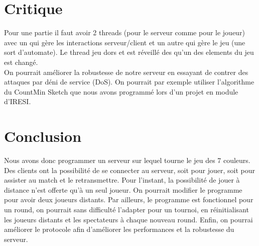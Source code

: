 \documentclass[a4paper]{article}
\begin{document}
\section{Critique}

Pour une partie il faut avoir 2 threads (pour le serveur comme pour le joueur) 
avec un qui gère les interactions serveur/client et un autre qui gère le jeu 
(une sort d'automate). Le thread jeu dors et est réveillé des qu'un des 
elements du jeu est changé. \\


On pourrait améliorer la robustesse de notre serveur en essayant de contrer des attaques par déni de service (DoS). On pourrait par exemple utiliser l'algorithme du CountMin Sketch que nous avons programmé lors d'un projet en module d'IRESI. \\


\section*{Conclusion}

Nous avons donc programmer un serveur sur lequel tourne le jeu des 7 couleurs. Des clients ont la possibilité de se connecter au serveur, soit pour jouer, soit pour assister au match et le retransmettre. Pour l'instant, la possibilité de jouer à distance n'est offerte qu'à un seul joueur. On pourrait modifier le programme pour avoir deux joueurs distants. Par ailleurs, le programme est fonctionnel pour un round, on pourrait sans difficulté l'adapter pour un tournoi, en réinitialisant les joueurs distants et les spectateurs à chaque nouveau round. Enfin, on pourrai améliorer le protocole afin d'améliorer les performances et la robustesse du serveur.


 

\end{document}
